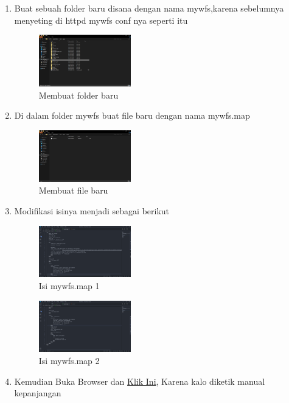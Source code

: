 \begin{enumerate}
  \item Buat sebuah folder baru disana dengan nama mywfs,karena sebelumnya menyeting di httpd mywfs conf nya seperti itu
  \hfill\break
    \begin{figure}[H]
		\includegraphics[width=4cm]{figures/1174031/4/16.png}
		\centering
		\caption{Membuat folder baru}
    \end{figure}
  \item Di dalam folder mywfs buat file baru dengan nama mywfs.map
  \hfill\break
    \begin{figure}[H]
		\includegraphics[width=4cm]{figures/1174031/4/17.png}
		\centering
		\caption{Membuat file baru}
    \end{figure}
  \item Modifikasi isinya menjadi sebagai berikut
  \hfill\break
    \begin{figure}[H]
		\includegraphics[width=4cm]{figures/1174031/4/18.png}
		\centering
		\caption{Isi mywfs.map 1}
    \end{figure}
    \hfill\break
    \begin{figure}[H]
		\includegraphics[width=4cm]{figures/1174031/4/19.png}
		\centering
		\caption{Isi mywfs.map 2}
    \end{figure}
  \item Kemudian Buka Browser dan \href{http://localhost:8080/cgi-bin/mapserv.exe?map=/ms4w/apps/mywfs/mywfs.map&SERVICE=WFS&VERSION=1.0.0&REQUEST=GetCapabilities}{Klik Ini}, Karena kalo diketik manual kepanjangan

\end{enumerate}
